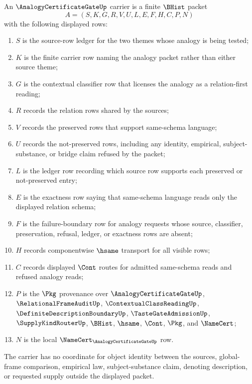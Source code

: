 \begin{definition}
\label{def:analogy-certificate-gate-carrier}
An $\AnalogyCertificateGateUp$ carrier is a finite $\BHist$ packet
$$
A=(S,K,G,R,V,U,L,E,F,H,C,P,N)
$$
with the following displayed rows:
\begin{enumerate}
\item $S$ is the source-row ledger for the two themes whose analogy is being tested;
\item $K$ is the finite carrier row naming the analogy packet rather than either source theme;
\item $G$ is the contextual classifier row that licenses the analogy as a relation-first reading;
\item $R$ records the relation rows shared by the sources;
\item $V$ records the preserved rows that support same-schema language;
\item $U$ records the not-preserved rows, including any identity, empirical, subject-substance, or bridge claim refused by the packet;
\item $L$ is the ledger row recording which source row supports each preserved or not-preserved entry;
\item $E$ is the exactness row saying that same-schema language reads only the displayed relation schema;
\item $F$ is the failure-boundary row for analogy requests whose source, classifier, preservation, refusal, ledger, or exactness rows are absent;
\item $H$ records componentwise $\hsame$ transport for all visible rows;
\item $C$ records displayed $\Cont$ routes for admitted same-schema reads and refused analogy reads;
\item $P$ is the $\Pkg$ provenance over $\AnalogyCertificateGateUp$, $\RelationalFrameAuditUp$, $\ContextualClassReadingUp$, $\DefiniteDescriptionBoundaryUp$, $\TasteGateAdmissionUp$, $\SupplyKindRouterUp$, $\BHist$, $\hsame$, $\Cont$, $\Pkg$, and $\NameCert$;
\item $N$ is the local $\NameCert_{\AnalogyCertificateGateUp}$ row.
\end{enumerate}
The carrier has no coordinate for object identity between the sources, global-frame comparison, empirical law, subject-substance claim, denoting description, or requested supply outside the displayed packet.
\end{definition}

